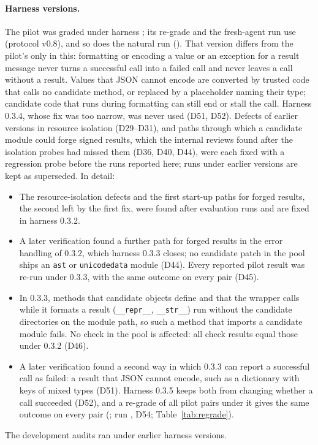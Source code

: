 \paragraph{Harness versions.} The pilot was graded under harness ; its re-grade and the fresh-agent run
use  (protocol v0.8), and so does the natural run (). That version differs from the
pilot's only in this: formatting
or encoding a value or an exception for a result message never turns a successful call into a failed call and never
leaves a call without a result. Values that JSON cannot encode are converted by trusted code that calls no candidate
method, or replaced by a placeholder naming their type; candidate code that runs during formatting can still end or
stall the call. Harness 0.3.4, whose fix was too narrow, was never used (D51, D52). Defects of earlier versions in
resource isolation (D29--D31), and paths through which a candidate module could forge signed results, which the
internal reviews found after the isolation probes had missed them (D36, D40, D44), were each fixed with a regression
probe before the runs reported here; runs under earlier versions are kept as superseded. In detail:
\begin{itemize}
\item The resource-isolation defects and the first start-up paths for forged results, the second left by the first fix,
  were found after evaluation runs and are fixed in harness 0.3.2.
\item A later verification found a further path for forged results in the error handling of 0.3.2, which harness 0.3.3
  closes; no candidate patch in the pool ships an \texttt{ast} or \texttt{unicodedata} module (D44). Every reported pilot
  result was re-run under 0.3.3, with the same outcome on every pair (D45).
\item In 0.3.3, methods that candidate objects define and that the wrapper calls while it formats a result
  (\texttt{\_\_repr\_\_}, \texttt{\_\_str\_\_}) run without the candidate directories on the module path, so such a method
  that imports a candidate module fails. No check in the pool is affected: all  check results equal those
  under 0.3.2 (D46).
\item A later verification found a second way in which 0.3.3 can report a successful call as failed: a result that JSON
  cannot encode, such as a dictionary with keys of mixed types (D51). Harness 0.3.5 keeps both from changing whether a
  call succeeded (D52), and a re-grade of all  pilot pairs under it gives the same outcome on every pair
  (; run \texttt{\REGRADERUN}, D54; Table~\ref{tab:regrade}).
\end{itemize}
The development audits ran under earlier harness versions.

